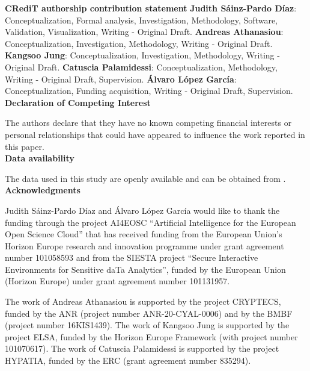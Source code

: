 \documentclass[5p,times]{elsarticle}
\begin{document}
\noindent \textbf{CRediT authorship contribution statement}
\noindent \textbf{Judith Sáinz-Pardo Díaz}: Conceptualization, Formal analysis, Investigation,   Methodology, Software, Validation, Visualization, Writing - Original Draft. 
\textbf{Andreas Athanasiou}: Conceptualization, Investigation, Methodology,  Writing - Original Draft.
\textbf{Kangsoo Jung}: Conceptualization, Investigation, Methodology,  Writing - Original Draft.
\textbf{Catuscia Palamidessi}: Conceptualization, Methodology,  Writing - Original Draft, Supervision.
\textbf{Álvaro López García}: Conceptualization, Funding acquisition, Writing - Original Draft, Supervision.\\


\noindent \textbf{Declaration of Competing Interest}

\noindent The authors declare that they have no known competing financial interests or personal relationships that could have appeared to influence the work reported in this paper.\\

\noindent \textbf{Data availability}

\noindent The data used in this study are openly available and can be obtained from \cite{alzheimer_mri_dataset}.\\

\noindent \textbf{Acknowledgments}

\noindent Judith Sáinz-Pardo Díaz and Álvaro López García would like to thank the funding through the project AI4EOSC ``Artificial Intelligence for the European Open Science Cloud'' that has received funding from the European Union's Horizon Europe research and innovation programme under grant agreement number 101058593 and from the SIESTA project ``Secure Interactive Environments for Sensitive daTa Analytics'', funded by the European Union (Horizon Europe) under grant agreement number 101131957.

\noindent The work of Andreas Athanasiou is supported by the project CRYPTECS, funded by the ANR (project number ANR-20-CYAL-0006) and by the BMBF (project number 16KIS1439). The work of
Kangsoo Jung is supported by the project ELSA, funded by the Horizon Europe Framework (with project number 101070617). The work of Catuscia Palamidessi is supported by the project HYPATIA, funded by the ERC (grant agreement number 835294).





\clearpage
\onecolumn
\appendix
\end{document}
